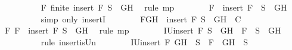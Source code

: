 \begin{isabellebody}
\ \ \ \ \ \ \ \ \isamarkupfalse%
\ F{}\ {\isacartoucheopen}finite\ {\isacharparenleft}insert\ F\ {\isacharparenleft}S{\isacharprime}\ {\isacharminus}\ {\isacharbraceleft}G{\isacharcomma}H{\isacharbraceright}{\isacharparenright}{\isacharparenright}{\isacartoucheclose}\ \isamarkupfalse%
\ {\isacharparenleft}rule\ mp{\isacharparenright}\isanewline
\ \ \ \ \ \ \isamarkupfalse%
\ {\isachardoublequoteopen}F\ {\isasymin}\ {\isacharparenleft}insert\ F\ \ {\isacharparenleft}S{\isacharprime}\ {\isacharminus}\ {\isacharbraceleft}G{\isacharcomma}H{\isacharbraceright}{\isacharparenright}{\isacharparenright}{\isachardoublequoteclose}\isanewline
\ \ \ \ \ \ \ \ \isamarkupfalse%
\ {\isacharparenleft}simp\ only{\isacharcolon}\ insertI{}{\isacharparenright}\isanewline
\ \ \ \ \ \ \isamarkupfalse%
\ F{}{\isacharcolon}{\isachardoublequoteopen}{\isacharbraceleft}G{\isacharcomma}H{\isacharbraceright}\ {\isasymunion}\ {\isacharparenleft}insert\ F\ {\isacharparenleft}S{\isacharprime}\ {\isacharminus}\ {\isacharbraceleft}G{\isacharcomma}H{\isacharbraceright}{\isacharparenright}{\isacharparenright}\ {\isasymin}\ C{\isachardoublequoteclose}\isanewline
\ \ \ \ \ \ \ \ \isamarkupfalse%
\ F{}\ {\isacartoucheopen}F\ {\isasymin}\ insert\ F\ {\isacharparenleft}S{\isacharprime}\ {\isacharminus}\ {\isacharbraceleft}G{\isacharcomma}H{\isacharbraceright}{\isacharparenright}{\isacartoucheclose}\ \isamarkupfalse%
\ {\isacharparenleft}rule\ mp{\isacharparenright}\isanewline
\ \ \ \ \ \ \isamarkupfalse%
\ IU{}{\isacharcolon}{\isachardoublequoteopen}insert\ F\ {\isacharparenleft}S{\isacharprime}\ {\isacharminus}\ {\isacharbraceleft}G{\isacharcomma}H{\isacharbraceright}{\isacharparenright}\ {\isacharequal}\ {\isacharbraceleft}F{\isacharbraceright}\ {\isasymunion}\ {\isacharparenleft}S{\isacharprime}\ {\isacharminus}\ {\isacharbraceleft}G{\isacharcomma}H{\isacharbraceright}{\isacharparenright}{\isachardoublequoteclose}\isanewline
\ \ \ \ \ \ \ \ \isamarkupfalse%
\ {\isacharparenleft}rule\ insert{\isacharunderscore}is{\isacharunderscore}Un{\isacharparenright}\isanewline
\ \ \ \ \ \ \isamarkupfalse%
\ IU{}{\isacharcolon}{\isachardoublequoteopen}insert\ F\ {\isacharparenleft}{\isacharbraceleft}G{\isacharcomma}H{\isacharbraceright}\ {\isasymunion}\ S{\isacharprime}{\isacharparenright}\ {\isacharequal}\ {\isacharbraceleft}F{\isacharbraceright}\ {\isasymunion}\ {\isacharparenleft}{\isacharbraceleft}G{\isacharcomma}H{\isacharbraceright}\ {\isasymunion}\ S{\isacharprime}{\isacharparenright}{\isachardoublequoteclose}\isanewline

\end{isabellebody}
